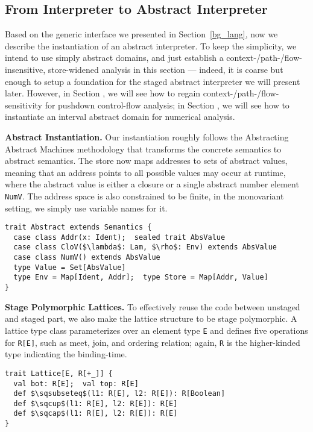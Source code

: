 \subsection{From Interpreter to Abstract Interpreter}

Based on the generic interface we presented in Section~\ref{bg_lang}, now we describe the instantiation of an
abstract interpreter.
To keep the simplicity, we intend to use simply abstract domains, and just establish a 
context-/path-/flow-insensitive, store-widened analysis in this section --- indeed, it is coarse 
but enough to setup a foundation for the staged abstract interpreter we will present later.
However, in Section , we will see how to regain context-/path-/flow-sensitivity 
for pushdown control-flow analysis; in Section , we will see how to instantiate 
an interval abstract domain for numerical analysis.

\textbf{Abstract Instantiation.}
Our instantiation roughly follows the Abstracting Abstract Machines methodology 
\cite{DBLP:conf/icfp/HornM10, DBLP:journals/jfp/HornM12} that transforms the concrete semantics 
to abstract semantics. The store now maps addresses to sets of abstract values, meaning that an address points
to all possible values may occur at runtime, where the abstract value is either a closure or 
a single abstract number element \texttt{NumV}. The address space is also
constrained to be finite, in the monovariant setting, we simply use variable names for it.

\begin{lstlisting}
trait Abstract extends Semantics {
  case class Addr(x: Ident);  sealed trait AbsValue
  case class CloV($\lambda$: Lam, $\rho$: Env) extends AbsValue
  case class NumV() extends AbsValue
  type Value = Set[AbsValue]
  type Env = Map[Ident, Addr];  type Store = Map[Addr, Value]
}
\end{lstlisting}

\textbf{Stage Polymorphic Lattices.}
To effectively reuse the code between unstaged and staged part, we also make the lattice structure to
be stage polymorphic. A lattice type class parameterizes over an element type \texttt{E} and defines
five operations for \texttt{R[E]}, such as meet, join, and ordering relation; again, \texttt{R} 
is the higher-kinded type indicating the binding-time.
\begin{lstlisting}
trait Lattice[E, R[+_]] {
  val bot: R[E];  val top: R[E]
  def $\sqsubseteq$(l1: R[E], l2: R[E]): R[Boolean]
  def $\sqcup$(l1: R[E], l2: R[E]): R[E]
  def $\sqcap$(l1: R[E], l2: R[E]): R[E]
}
\end{lstlisting}

